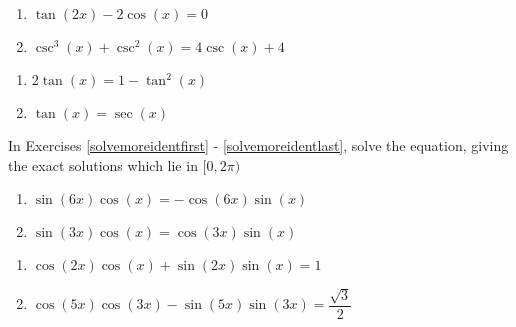 \begin{multicols}{2}

\begin{enumerate}

\setcounter{enumi}{\value{HW}}

\item $\tan (2x) - 2\cos(x) = 0$
\item $\csc^{3}(x) + \csc^{2}(x) = 4\csc(x) + 4$

\setcounter{HW}{\value{enumi}}

\end{enumerate}

\end{multicols}
\enlargethispage{.5in}
\vspace{-.1in}
\begin{multicols}{2}

\begin{enumerate}

\setcounter{enumi}{\value{HW}}

\item $2\tan(x) = 1 - \tan^{2}(x)$
\item $\tan \left( x \right) = \sec \left( x \right)$ \label{solveidentlast}

\setcounter{HW}{\value{enumi}}

\end{enumerate}

\end{multicols}

In Exercises \ref{solvemoreidentfirst} - \ref{solvemoreidentlast}, solve the equation, giving the exact solutions which lie in $[0, 2\pi)$


\begin{multicols}{2}

\begin{enumerate}

\setcounter{enumi}{\value{HW}}

\item $\sin(6x) \cos(x) = -\cos(6x) \sin(x)$ \label{solvemoreidentfirst}
\item  $\sin(3x)\cos(x) = \cos(3x) \sin(x)$

\setcounter{HW}{\value{enumi}}

\end{enumerate}

\end{multicols}

\begin{multicols}{2}

\begin{enumerate}

\setcounter{enumi}{\value{HW}}

\item $\cos(2x)\cos(x) + \sin(2x)\sin(x) = 1$ 
\item \small $\cos(5x)\cos(3x) - \sin(5x)\sin(3x) = \dfrac{\sqrt{3}}{2}$ \normalsize

\setcounter{HW}{\value{enumi}}

\end{enumerate}

\end{multicols}

